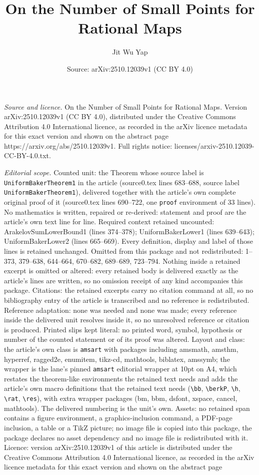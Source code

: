 \documentclass[10pt,a4paper]{amsart}
\title[On the Number of Small Points for Rational Maps]{On the Number of Small Points for Rational Maps}
\author{Jit Wu Yap}
\date{Source: arXiv:2510.12039v1 (CC BY 4.0)}
\begin{document}
\maketitle

\noindent\emph{Source and licence.} On the Number of Small Points for Rational Maps. Version arXiv:2510.12039v1 (CC BY 4.0), distributed under the Creative Commons Attribution 4.0 International licence, as recorded in the arXiv licence metadata for this exact version and shown on the abstract page https://arxiv.org/abs/2510.12039v1. Full rights notice: licenses/arxiv-2510.12039-CC-BY-4.0.txt.\par\smallskip

\noindent\textit{Editorial scope.} Counted unit: the Theorem whose source label is \texttt{UniformBakerTheorem1} in the article (source0.tex lines 683--688, source label \texttt{UniformBakerTheorem1}), delivered together with the article's own complete original proof of it (source0.tex lines 690--722, one \texttt{proof} environment of 33 lines). No mathematics is written, repaired or re-derived: statement and proof are the article's own text line for line. Required context retained uncounted: ArakelovSumLowerBound1 (lines 374--378); UniformBakerLower1 (lines 639--643); UniformBakerLower2 (lines 665--669). Every definition, display and label of those lines is retained unchanged. Omitted from this package and not redistributed: 1--373, 379--638, 644--664, 670--682, 689--689, 723--794. Nothing inside a retained excerpt is omitted or altered: every retained body is delivered exactly as the article's lines are written, so no omission receipt of any kind accompanies this package. Citations: the retained excerpts carry no citation command at all, so no bibliography entry of the article is transcribed and no reference is redistributed. Reference adaptation: none was needed and none was made; every reference inside the delivered unit resolves inside it, so no unresolved reference or citation is produced. Printed slips kept literal: no printed word, symbol, hypothesis or number of the counted statement or of its proof was altered. Layout and class: the article's own class is \texttt{amsart} with packages including amsmath, amsthm, hyperref, ragged2e, enumitem, tikz-cd, mathtools, biblatex, amssymb; the wrapper is the lane's pinned \texttt{amsart} editorial wrapper at 10pt on A4, which restates the theorem-like environments the retained text needs and adds the article's own macro definitions that the retained text needs (\texttt{\textbackslash bb}, \texttt{\textbackslash berkP}, \texttt{\textbackslash h}, \texttt{\textbackslash rat}, \texttt{\textbackslash res}), with extra wrapper packages (bm, bbm, dsfont, xspace, cancel, mathtools). The delivered numbering is the unit's own. Assets: no retained span contains a figure environment, a graphics-inclusion command, a PDF-page inclusion, a table or a TikZ picture; no image file is copied into this package, the package declares no asset dependency and no image file is redistributed with it. Licence: version arXiv:2510.12039v1 of this article is distributed under the Creative Commons Attribution 4.0 International licence, as recorded in the arXiv licence metadata for this exact version and shown on the abstract page 
\end{document}
